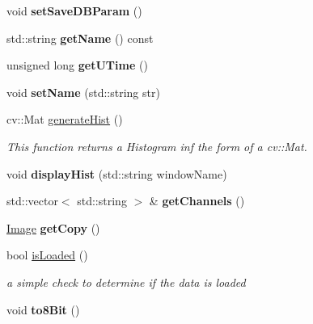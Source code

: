 \begin{DoxyCompactItemize}
\item 
void {\bfseries set\+Save\+D\+B\+Param} ()\hypertarget{classImage_a55ff7e2ed3f552f49f9ea139e4545718}{}\label{classImage_a55ff7e2ed3f552f49f9ea139e4545718}

\item 
std\+::string {\bfseries get\+Name} () const \hypertarget{classImage_acdd2b0d19aa5f00e1177e700db2bea5b}{}\label{classImage_acdd2b0d19aa5f00e1177e700db2bea5b}

\item 
unsigned long {\bfseries get\+U\+Time} ()\hypertarget{classImage_a1cb942960098498f91b180909913c10b}{}\label{classImage_a1cb942960098498f91b180909913c10b}

\item 
void {\bfseries set\+Name} (std\+::string str)\hypertarget{classImage_aa4e028c7e168f66d705b6e1a9072ee1d}{}\label{classImage_aa4e028c7e168f66d705b6e1a9072ee1d}

\item 
cv\+::\+Mat \hyperlink{classImage_ab5320afddf5e1f2f91de8b55d4c34f4f}{generate\+Hist} ()
\begin{DoxyCompactList}\small\item\em This function returns a Histogram inf the form of a cv\+::\+Mat. \end{DoxyCompactList}\item 
void {\bfseries display\+Hist} (std\+::string window\+Name)\hypertarget{classImage_ac90012db4bf46088777b9e03a9c20700}{}\label{classImage_ac90012db4bf46088777b9e03a9c20700}

\item 
std\+::vector$<$ std\+::string $>$ \& {\bfseries get\+Channels} ()\hypertarget{classImage_a52c5c706f2a5b87271b1d817b61f3b59}{}\label{classImage_a52c5c706f2a5b87271b1d817b61f3b59}

\item 
\hyperlink{classImage}{Image} {\bfseries get\+Copy} ()\hypertarget{classImage_a03bf7a24f3a8c010430384dde4e46304}{}\label{classImage_a03bf7a24f3a8c010430384dde4e46304}

\item 
bool \hyperlink{classImage_a7a3bf833c8e740d483f46eff90c90889}{is\+Loaded} ()
\begin{DoxyCompactList}\small\item\em a simple check to determine if the data is loaded \end{DoxyCompactList}\item 
void {\bfseries to8\+Bit} ()\hypertarget{classImage_abb27cf7805e76d571e8353b77c8f02a4}{}\label{classImage_abb27cf7805e76d571e8353b77c8f02a4}


\end{DoxyCompactItemize}
